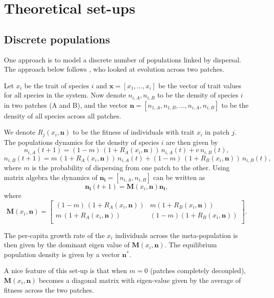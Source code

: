 \documentclass[a4paper,11pt]{article}
\begin{document}
\section{Theoretical set-ups}

\subsection{Discrete populations}

One approach is to model a discrete number of populations linked by dispersal. The approach below follows \citet{Pontarp-2015}, who looked at evolution across two patches.

Let $x_i$ be the trait of species $i$ and $\mathbf{x} = [x_1,\ldots, x_i]$ be the vector of trait values for all species in the system. Now denote $n_{i,A}, n_{i,B}$ to be the density of species $i$ in two patches (A and B), and the vector $\mathbf{n} = [n_{1,A}, n_{1,B}, \ldots, n_{i,A}, n_{i,B}]$ to be the density of all species across all patches.

We denote $R_j(x_i, \mathbf{n})$ to be the fitness of individuals with trait $x_i$ in patch $j$. The populations dynamics for the density of species $i$ are then given by
$$n_{i,A}(t+1) = (1-m) \,(1+R_A(x_i, \mathbf{n})) \, n_{i,A}(t) + v\, n_{i,B}(t),$$
$$n_{i,B}(t+1) = m  \, (1+R_A(x_i, \mathbf{n}))\, n_{i,A}(t) + (1-m) \,  (1+R_B(x_i, \mathbf{n})) \, n_{i,B}(t),$$
where $m$ is the probability of dispersing from one patch to the other. Using matrix algebra the dynamics of $\mathbf{n_i} = [n_{i,A}, n_{i,B}]$ can be written as
$$\mathbf{n_i}(t+1)=\mathbf{M}(x_i, \mathbf{n}) \mathbf{n_i},$$
where
$$ \mathbf{M}(x_i, \mathbf{n}) =  \left[ \begin{array}{cc}
(1-m) \,(1+R_A(x_i, \mathbf{n})) & m (1+R_B(x_i, \mathbf{n})) \\
m \,(1+R_A(x_i, \mathbf{n})) & (1-m) (1+R_B(x_i, \mathbf{n})) \\
\end{array} \right].$$

The per-capita growth rate of the $x_i$ individuals across the meta-population is then given by the dominant eigen value of $\mathbf{M}(x_i, \mathbf{n})$. The equilibrium population density is given by a vector $\mathbf{n^*}$.

A nice feature of this set-up is that when $m=0$ (patches completely decoupled), $\mathbf{M}(x_i, \mathbf{n})$ becomes a diagonal matrix with eigen-value given by the average of fitness across the two patches.
\end{document}

